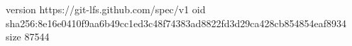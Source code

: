 version https://git-lfs.github.com/spec/v1
oid sha256:8e16e0410f9aa6b49cc1ed3c48f74383ad8822fd3d29ca428cb854854eaf8934
size 87544
